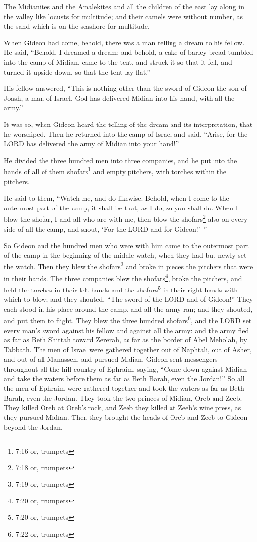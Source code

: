 \myverse{}The Midianites and the Amalekites and all the children of the
east lay along in the valley like locusts for multitude; and their camels were without number, as the
sand which is on the seashore for multitude.

\myverse{}When Gideon had come, behold, there was a man telling a dream
to his fellow. He said, “Behold, I dreamed a dream; and behold, a cake of barley bread tumbled into the
camp of Midian, came to the tent, and struck it so that it fell, and turned it upside down, so that the
tent lay flat.”

\myverse{}His fellow answered, “This is nothing other than the sword of
Gideon the son of Joash, a man of Israel. God has delivered Midian into his hand, with all the army.”

\myverse{}It was so, when Gideon heard the telling of the dream and its
interpretation, that he worshiped. Then he returned into the camp of Israel and said, “Arise, for the
LORD has delivered the army of Midian into your hand!”

\myverse{}He divided the three hundred men into three companies, and he
put into the hands of all of them shofars\footnote{7:16 or, trumpets} and empty pitchers, with torches
within the pitchers.

\myverse{}He said to them, “Watch me, and do likewise. Behold, when I come
to the outermost part of the camp, it shall be that, as I do, so you shall do.
\myverse{}When I blow the shofar, I and all who are with me, then blow the shofars\footnote{7:18 or, trumpets}
also on every side of all the camp, and shout, ‘For the LORD and for Gideon!’ ”

\myverse{}So Gideon and the hundred men who were with him came to the outermost
part of the camp in the beginning of the middle watch, when they had but newly set the watch. Then they
blew the shofars\footnote{7:19 or, trumpets} and broke in pieces the pitchers that were in their hands.
\myverse{}The three companies blew the shofars\footnote{7:20 or, trumpets}, broke
the pitchers, and held the torches in their left hands and the shofars\footnote{7:20 or, trumpets} in
their right hands with which to blow; and they shouted, “The sword of the LORD and of Gideon!”
\myverse{}They each stood in his place around the camp, and all the army ran; and they
shouted, and put them to flight.
\myverse{}They blew the three hundred shofars\footnote{7:22 or, trumpets}, and the
LORD set every man’s sword against his fellow and against all the army; and the army fled as far as Beth
Shittah toward Zererah, as far as the border of Abel Meholah, by Tabbath.
\myverse{}The men of Israel were gathered together out of Naphtali, out of Asher, and
out of all Manasseh, and pursued Midian.
\myverse{}Gideon sent messengers throughout all the hill country of Ephraim, saying,
“Come down against Midian and take the waters before them as far as Beth Barah, even the Jordan!” So all
the men of Ephraim were gathered together and took the waters as far as Beth Barah, even the Jordan.
\myverse{}They took the two princes of Midian, Oreb and Zeeb. They killed Oreb at Oreb’s
rock, and Zeeb they killed at Zeeb’s wine press, as they pursued Midian. Then they brought the heads of
Oreb and Zeeb to Gideon beyond the Jordan.



